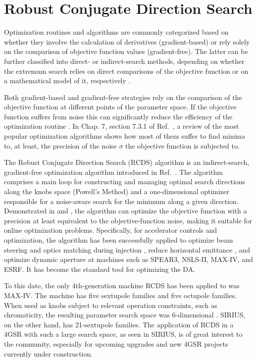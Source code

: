 \section{Robust Conjugate Direction Search}
Optimization routines and algorithms are commonly categorized based on whether they involve the calculation of derivatives (gradient-based) or rely solely on the comparison of objective function values (gradient-free). The latter can be further classified into direct- or indirect-search methods, depending on whether the extremum search relies on direct comparisons of the objective function or on a mathematical model of it, respectively \cite{press_numerical_2007}.

Both gradient-based and gradient-free strategies rely on the comparison of the objective function at different points of the parameter space. If the objective function suffers from noise this can significantly reduce the efficiency of the optimization routine \cite{press_numerical_2007, huang_beam-based_2019}. In Chap. 7, section 7.3.1 of Ref.~\cite{huang_beam-based_2019}, a review of the most popular optimization algorithms shows how most of them suffer to find minima to, at least, the precision of the noise $\sigma$ the objective function is subjected to.

The Robust Conjugate Direction Search (RCDS) algorithm is an indirect-search, gradient-free optimization algorithm introduced in Ref.~\cite{huang_algorithm_2013}. The algorithm comprises a main loop for constructing and managing optimal search directions along the knobs space (Powell's Method) and a one-dimensional optimizer responsible for a noise-aware search for the minimum along a given direction. Demonstrated in \cite{huang_algorithm_2013} and \cite[section 7.3.3]{huang_beam-based_2019}, the algorithm can optimize the objective function with a precision at least equivalent to the objective-function noise, making it suitable for online optimization problems. Specifically, for accelerator controls and optimization, the algorithm has been successfully applied to optimize beam steering and optics matching during injection \cite{huang_algorithm_2013}, reduce horizontal emittance \cite{huang_algorithm_2013, huang_online_2015}, and optimize dynamic aperture \cite{huang_algorithm_2013, huang_online_2015,liuzzo_rcds_2016,olsson_online_2018,yang_online_2022} at machines such as SPEAR3, NSLS-II, MAX-IV, and ESRF. It has become the standard tool for optimizing the DA.

To this date, the only 4th-generation machine RCDS has been applied to was MAX-IV. The machine has five sextupole families and five octupole families. When used as knobs subject to relevant operation constraints, such as chromaticity, the resulting parameter search space was 6-dimensional \cite{olsson_online_2018}. SIRIUS, on the other hand, has 21-sextupole families. The application of RCDS in a 4GSR with such a large search space, as seen in SIRIUS, is of great interest to the community, especially for upcoming upgrades and new 4GSR projects currently under construction.

